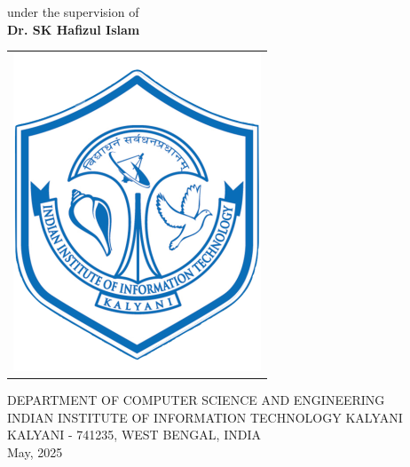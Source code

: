 \vspace{-0.1cm}
\begin{center}
  \begin{large}
    under the supervision of\\
    \vspace{.2cm}
    \textbf {Dr. SK Hafizul Islam}\\
    \vspace{.2cm}
  \end{large}
\end{center}
\begin{center}
  \begin{tabular}{l}
    \includegraphics[width = 3 cm]{Figure/header/IIITK.png}
  \end{tabular}
\end{center}
\vspace{-0.3cm}
\begin{center}
  \begin{large}
    \vspace{0.15cm}
  \hspace{-3.5mm} DEPARTMENT OF COMPUTER SCIENCE AND ENGINEERING \\ 
 \hspace{-7.5mm} INDIAN INSTITUTE OF INFORMATION TECHNOLOGY KALYANI\\[0.35cm]
 KALYANI - 741235, WEST BENGAL, INDIA\\
 \vskip 40pt
 May, 2025
  \end{large}
\end{center}

\newpage
\cleardoublepage

\newpage
\thispagestyle{empty} \mbox{}
\setcounter{page}{0}
\pagestyle{plain}

%
\cleardoublepage

\cleardoublepage

\cleardoublepage

\cleardoublepage

\cleardoublepage
\tableofcontents
\cleardoublepage
\listoffigures
\cleardoublepage

\cleardoublepage
\clearpage

